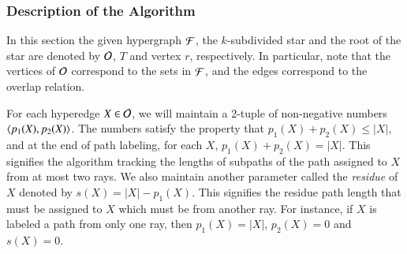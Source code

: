 \documentclass[MS,synopsis]{iitmdiss}
\begin{document}
\subsubsection{Description of the Algorithm}
In this section the given hypergraph ${\cal F}$, the $k$-subdivided star
and the root of the star are denoted by ${\cal O}$, $T$ and vertex $r$,
respectively.  In particular, note that the vertices of ${\cal O}$
correspond to the sets in ${\cal F}$, and the edges correspond to the
overlap relation.

For each hyperedge $X \in {\cal O}$, we will maintain a 2-tuple of non-negative
 numbers $\left\langle p_1(X), p_2(X) \right\rangle$.  The numbers satisfy the property that
 $p_1(X) + p_2(X) \leq |X|$, and at the end of path labeling, for each
 $X$, $p_1(X) + p_2(X) = |X|$.  This signifies the algorithm tracking
 the lengths of subpaths of the path assigned to $X$ from at most two
 rays. We also maintain another parameter called the {\em residue} of
 $X$ denoted by $s(X)=|X| - p_1(X)$. This signifies the residue path
 length that must be assigned to $X$ which must be from another
 ray. For instance, if $X$ is labeled a path from only one ray, then
 $p_1(X) = |X|$, $p_2(X) = 0$ and $s(X) = 0$.
\end{document}
